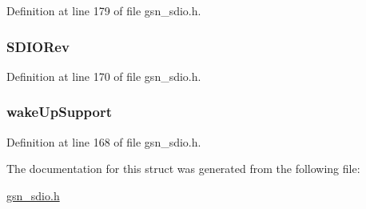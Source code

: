 Definition at line 179 of file gsn\_\-sdio.h.

\hypertarget{a00458_a33e2ba9931ca5b1d35bd575c69e34480}{
\subsubsection[{SDIORev}]{ {\bf SDIORev}}}
\label{a00458_a33e2ba9931ca5b1d35bd575c69e34480}


Definition at line 170 of file gsn\_\-sdio.h.

\hypertarget{a00458_a8a7856ebd7f5cdd38da9f4c76764c776}{
\subsubsection[{wakeUpSupport}]{ {\bf wakeUpSupport}}}
\label{a00458_a8a7856ebd7f5cdd38da9f4c76764c776}


Definition at line 168 of file gsn\_\-sdio.h.



The documentation for this struct was generated from the following file:\begin{DoxyCompactItemize}
\item 
\hyperlink{a00584}{gsn\_\-sdio.h}\end{DoxyCompactItemize}
